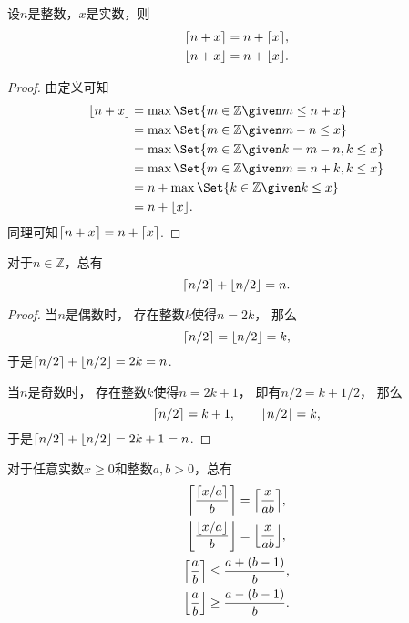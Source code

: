 \begin{proposition}
设\(n\)是整数，\(x\)是实数，则\begin{gather*}
	\lceil n+x\rceil = n + \lceil x\rceil, \\
	\lfloor n+x\rfloor = n + \lfloor x\rfloor.
\end{gather*}
\begin{proof}
由定义可知\begin{align*}
	\floor{n+x}
	&= \max\Set{ m\in\mathbb{Z} \given m \leq n+x } \\
	&= \max\Set{ m\in\mathbb{Z} \given m-n \leq x } \\
	&= \max\Set{ m\in\mathbb{Z} \given k=m-n, k \leq x } \\
	&= \max\Set{ m\in\mathbb{Z} \given m=n+k, k \leq x } \\
	&= n + \max\Set{ k\in\mathbb{Z} \given k \leq x } \\
	&= n + \floor{x}.
\end{align*}
同理可知\(\lceil n+x\rceil = n + \lceil x\rceil\).
\end{proof}
\end{proposition}

\begin{property}
对于\(n\in\mathbb{Z}\)，总有\begin{equation}
	\lceil n/2\rceil + \lfloor n/2\rfloor = n.
\end{equation}
\begin{proof}
当\(n\)是偶数时，
存在整数\(k\)使得\(n=2k\)，
那么\begin{equation*}
	\lceil n/2\rceil = \lfloor n/2\rfloor = k,
\end{equation*}
于是\(\lceil n/2\rceil + \lfloor n/2\rfloor = 2k = n\).

当\(n\)是奇数时，
存在整数\(k\)使得\(n=2k+1\)，
即有\(n/2 = k + 1/2\)，
那么\begin{equation*}
	\lceil n/2\rceil = k+1,
	\qquad
	\lfloor n/2\rfloor = k,
\end{equation*}
于是\(\lceil n/2\rceil + \lfloor n/2\rfloor = 2k+1 = n\).
\end{proof}
\end{property}

\begin{property}
对于任意实数\(x \geq 0\)和整数\(a,b>0\)，总有\begin{gather}
	\ceil*{\frac{\ceil{x/a}}{b}} = \ceil*{\frac{x}{ab}}, \\
	\floor*{\frac{\floor{x/a}}{b}} = \floor*{\frac{x}{ab}}, \\
	\ceil*{\frac{a}{b}} \leq \frac{a+(b-1)}{b}, \\
	\floor*{\frac{a}{b}} \geq \frac{a-(b-1)}{b}.
\end{gather}
\end{property}

